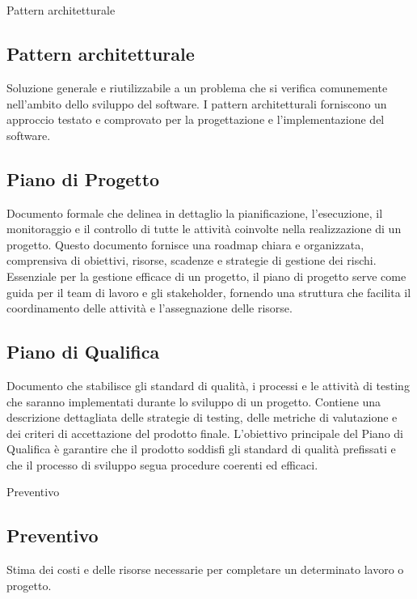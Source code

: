 
\section{}

\hypertarget{sec:pattern_architetturale}{Pattern architetturale}
\subsection*{Pattern architetturale}
Soluzione generale e riutilizzabile a un problema che si verifica comunemente nell’ambito dello sviluppo del software. I pattern 
architetturali forniscono un approccio testato e comprovato per la progettazione e l’implementazione del software.


\subsection*{Piano di Progetto}
Documento formale che delinea in dettaglio la pianificazione, l’esecuzione, il monitoraggio e il controllo di tutte le attività coinvolte nella 
realizzazione di un progetto. Questo documento fornisce una roadmap chiara e organizzata, comprensiva di obiettivi, risorse, scadenze e strategie di 
gestione dei rischi. Essenziale per la gestione efficace di un progetto, il piano di progetto serve come guida per il team di lavoro e gli stakeholder, 
fornendo una struttura che facilita il coordinamento delle attività e l’assegnazione delle risorse.

\subsection*{Piano di Qualifica}
Documento che stabilisce gli standard di qualità, i processi e le attività di testing che saranno implementati durante lo sviluppo di un progetto. 
Contiene una descrizione dettagliata delle strategie di testing, delle metriche di valutazione e dei criteri di accettazione del prodotto finale. 
L’obiettivo principale del Piano di Qualifica è garantire che il prodotto soddisfi gli standard di qualità prefissati e che il processo di sviluppo 
segua procedure coerenti ed efficaci.

\hypertarget{sec:preventivo}{Preventivo}
\subsection*{Preventivo}
Stima dei costi e delle risorse necessarie per completare un determinato lavoro o progetto.

